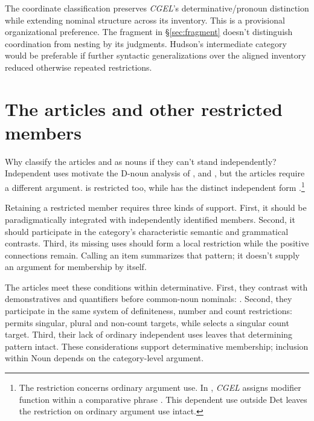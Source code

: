 \documentclass[12pt]{article}
\begin{document}
The coordinate classification preserves \textit{CGEL}'s determinative/pronoun distinction while extending nominal structure across its inventory. This is a provisional organizational preference. The fragment in §\ref{sec:fragment} doesn't distinguish coordination from nesting by its judgments. Hudson's intermediate category would be preferable if further syntactic generalizations over the aligned inventory reduced otherwise repeated restrictions.

\section{The articles and other restricted members}\label{sec:articles}

Why classify the articles  and  as nouns if they can't stand independently? Independent uses motivate the D-noun analysis of ,  and , but the articles require a different argument.  is restricted too, while  has the distinct independent form  \citep[371--372, 410--411]{huddleston2002}.\footnote{The restriction concerns ordinary argument use. In , \textit{CGEL} assigns  modifier function within a comparative phrase \citep[1131--1132, 1135--1136]{huddleston2002}. This dependent use outside Det leaves the restriction on ordinary argument use intact.}

Retaining a restricted member requires three kinds of support. First, it should be paradigmatically integrated with independently identified members. Second, it should participate in the category's characteristic semantic and grammatical contrasts. Third, its missing uses should form a local restriction while the positive connections remain. Calling an item  summarizes that pattern; it doesn't supply an argument for membership by itself.

The articles meet these conditions within determinative. First, they contrast with demonstratives and quantifiers before common-noun nominals: . Second, they participate in the same system of definiteness, number and count restrictions:  permits singular, plural and non-count targets, while  selects a singular count target. Third, their lack of ordinary independent uses leaves that determining pattern intact. These considerations support determinative membership; inclusion within Noun depends on the category-level argument.
\end{document}
